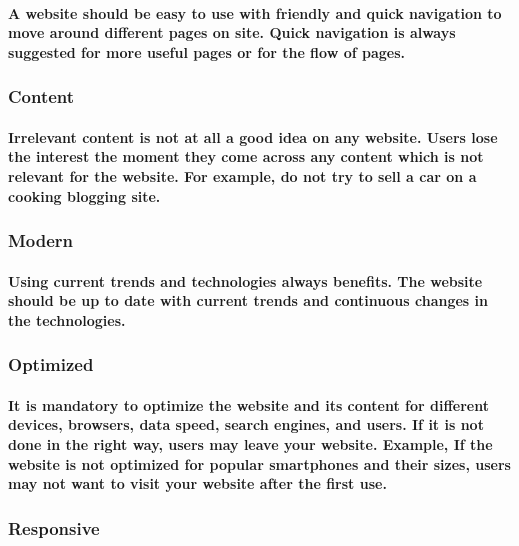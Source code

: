 \documentclass[12pt,a4paper]{article}
\begin{document}
    \paragraph{A website should be easy to use with friendly and quick navigation to move around different pages on site. Quick navigation is always suggested for more useful pages or for the flow of pages.
    }
    
    \subsubsection{Content}

    \paragraph{Irrelevant content is not at all a good idea on any website. Users lose the interest the moment they come across any content which is not relevant for the website. For example, do not try to sell a car on a cooking blogging site.
    }
    
    \subsubsection{Modern}

    \paragraph{Using current trends and technologies always benefits. The website should be up to date with current trends and continuous changes in the technologies.
    }
    
    \subsubsection{Optimized}

    \paragraph{It is mandatory to optimize the website and its content for different devices, browsers, data speed, search engines, and users. If it is not done in the right way, users may leave your website. Example, If the website is not optimized for popular smartphones and their sizes, users may not want to visit your website after the first use.
    }
    
    \subsubsection{Responsive}
\end{document}
